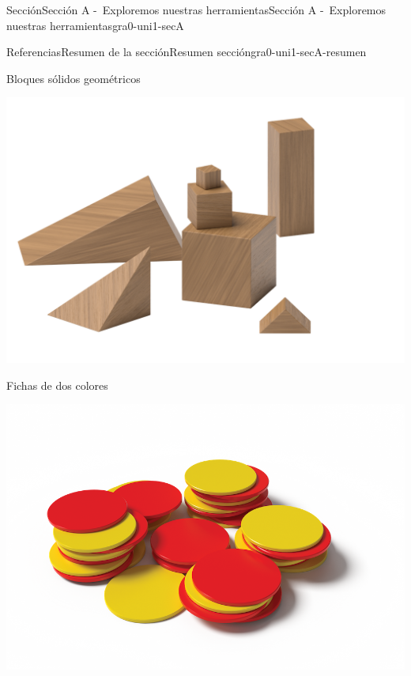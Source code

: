 \documentclass[twoside,10pt,]{article}
\begin{document}
\begin{sectionptx}{Sección}{Sección A -~Exploremos nuestras herramientas}{}{Sección A -~Exploremos nuestras herramientas}{}{}{gra0-uni1-secA}
\begin{references-subsection}{Referencias}{Resumen de la sección}{}{Resumen sección}{}{}{gra0-uni1-secA-resumen}
\begin{sidebyside}{2}{0.05}{0.05}{0.1}
\begin{sbspanel}{0.4}
\end{sbspanel}%
\end{sidebyside}%
\begin{sidebyside}{2}{0.05}{0.05}{0.1}%
\begin{sbspanel}{0.4}%
Bloques sólidos geométricos%
\par
\includegraphics[width=\linewidth]{external/png-source/K.1.A Beta Student Workbook.Geoblocks.png}
\end{sbspanel}%
\begin{sbspanel}{0.4}%
Fichas de dos colores%
\par
\includegraphics[width=\linewidth]{external/png-source/K.1.A Beta Student Workbook.RedYellowChips_withShadow.png}
\end{sbspanel}%
\end{sidebyside}%
\begin{sidebyside}{2}{0.05}{0.05}{0.1}%
\begin{sbspanel}{0.4}%

\end{sbspanel}
\end{sidebyside}
\end{references-subsection}
\end{sectionptx}
\end{document}
